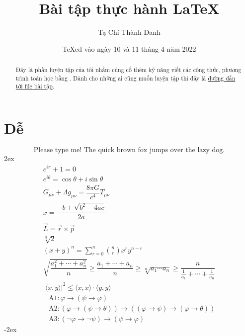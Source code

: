 \documentclass[a4paper,12pt,notitlepage]{article}
\title{Bài tập thực hành \LaTeX}
\author{Tạ Chí Thành Danh}
\date{\TeX ed vào ngày 10 và 11 tháng 4 năm 2022}
\newcommand{\f}[2]{\dfrac{#1}{#2}}
\begin{document}
	\maketitle
	\begin{abstract}
		Đây là phần luyện tập của tôi nhằm củng cố thêm kỹ năng viết các công thức, phương trình toán học bằng \LaTeXe.
		Dành cho những ai cũng muốn luyện tập thì đây là \href{https://web.mit.edu/~jgross/Public/latex/exercises.pdf}{đường dẫn tới file bài tập}.
	\end{abstract}
	\section{Dễ}
	\begin{equation}
		\text{Please type me! The quick brown fox jumps over the lazy dog.}
	\end{equation}
	\openup 2ex
	\begin{gather}
		e^{i \pi} + 1 = 0 \\
		e^{i \theta} = \cos \theta + i \sin \theta \\
		G_{\mu \nu} + \Lambda g_{\mu \nu} = \f{8\pi G}{c^4} T_{\mu \nu} \\
		x = \f{-b \pm \sqrt{b^2 - 4ac}}{2a} \\
		\vec{L} = \vec{r} \times \vec{p} \\
		\sqrt[3]{2} \\
		(x + y)^n = \sum_{r=0}^{n} \binom{n}{r} x^r y^{n-r} \\
		\sqrt{\f{a_1^2 + \cdots + a_n^2}{n}} \geq \f{a_1 + \cdots + a_n}{n} \geq \sqrt[n]{a_1 \cdots a_n} \geq \f{n}{\tfrac{1}{a_1} + \cdots + \tfrac{1}{a_n}} \\
		| \langle x, y \rangle | ^2 \leq \langle x, x \rangle \cdot \langle y, y \rangle %
	\end{gather}
	\begin{align}
	& \mathrm{A}1: \varphi \longrightarrow (\psi \rightarrow \varphi) \nonumber \\[-2ex]
	& \mathrm{A}2: (\varphi \rightarrow (\psi \rightarrow \theta)) \longrightarrow ((\varphi \rightarrow \psi) \rightarrow (\varphi \rightarrow \theta)) \nonumber \\[-2ex]
	& \mathrm{A}3: (\neg \varphi \rightarrow \neg \psi) \longrightarrow (\psi \rightarrow \varphi) 
	\end{align}
	\openup -2ex
\end{document}
